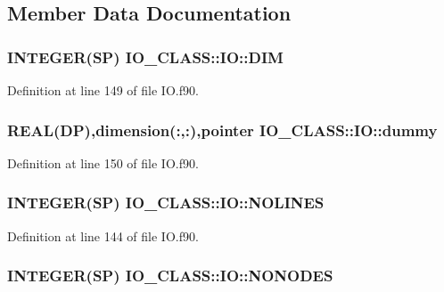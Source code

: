 \subsection{Member Data Documentation}
\hypertarget{typeIO__CLASS_1_1IO_ae4de46da7a025c4f4f8e8d6241418ee9}{
\subsubsection[{DIM}]{\setlength{\rightskip}{0pt plus 5cm}INTEGER(SP) {\bf IO\_\-CLASS::IO::DIM}}}
\label{typeIO__CLASS_1_1IO_ae4de46da7a025c4f4f8e8d6241418ee9}


Definition at line 149 of file IO.f90.

\hypertarget{typeIO__CLASS_1_1IO_a28657cb15afcf0b2725d64be12ab7c01}{
\subsubsection[{dummy}]{\setlength{\rightskip}{0pt plus 5cm}REAL(DP),dimension(:,:),pointer {\bf IO\_\-CLASS::IO::dummy}}}
\label{typeIO__CLASS_1_1IO_a28657cb15afcf0b2725d64be12ab7c01}


Definition at line 150 of file IO.f90.

\hypertarget{typeIO__CLASS_1_1IO_a3b70c5d8c06d577a282d4987fbdcfa5e}{
\subsubsection[{NOLINES}]{\setlength{\rightskip}{0pt plus 5cm}INTEGER(SP) {\bf IO\_\-CLASS::IO::NOLINES}}}
\label{typeIO__CLASS_1_1IO_a3b70c5d8c06d577a282d4987fbdcfa5e}


Definition at line 144 of file IO.f90.

\hypertarget{typeIO__CLASS_1_1IO_afb096dbfeea6075e4867273b2d2cd282}{
\subsubsection[{NONODES}]{\setlength{\rightskip}{0pt plus 5cm}INTEGER(SP) {\bf IO\_\-CLASS::IO::NONODES}}}
\label{typeIO__CLASS_1_1IO_afb096dbfeea6075e4867273b2d2cd282}


